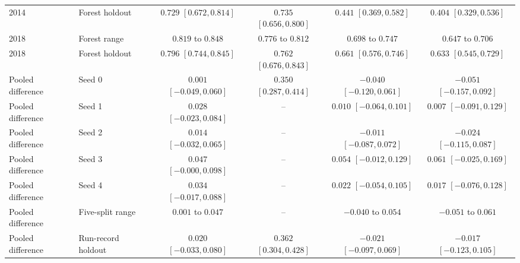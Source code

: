\begin{table}[t]
\begin{tabular}{@{}llcccc@{}}
2014 & Forest holdout & $0.729$ {\scriptsize $[0.672, 0.814]$} & $0.735$ {\scriptsize $[0.656, 0.800]$} & $0.441$ {\scriptsize $[0.369, 0.582]$} & $0.404$ {\scriptsize $[0.329, 0.536]$} \\
2018 & Forest range & $0.819$ to $0.848$ & $0.776$ to $0.812$ & $0.698$ to $0.747$ & $0.647$ to $0.706$ \\
2018 & Forest holdout & $0.796$ {\scriptsize $[0.744, 0.845]$} & $0.762$ {\scriptsize $[0.676, 0.843]$} & $0.661$ {\scriptsize $[0.576, 0.746]$} & $0.633$ {\scriptsize $[0.545, 0.729]$} \\
Pooled difference & Seed 0 & $0.001$ {\scriptsize $[-0.049, 0.060]$} & $0.350$ {\scriptsize $[0.287, 0.414]$} & $-0.040$ {\scriptsize $[-0.120, 0.061]$} & $-0.051$ {\scriptsize $[-0.157, 0.092]$} \\
Pooled difference & Seed 1 & $0.028$ {\scriptsize $[-0.023, 0.084]$} & -- & $0.010$ {\scriptsize $[-0.064, 0.101]$} & $0.007$ {\scriptsize $[-0.091, 0.129]$} \\
Pooled difference & Seed 2 & $0.014$ {\scriptsize $[-0.032, 0.065]$} & -- & $-0.011$ {\scriptsize $[-0.087, 0.072]$} & $-0.024$ {\scriptsize $[-0.115, 0.087]$} \\
Pooled difference & Seed 3 & $0.047$ {\scriptsize $[-0.000, 0.098]$} & -- & $0.054$ {\scriptsize $[-0.012, 0.129]$} & $0.061$ {\scriptsize $[-0.025, 0.169]$} \\
Pooled difference & Seed 4 & $0.034$ {\scriptsize $[-0.017, 0.088]$} & -- & $0.022$ {\scriptsize $[-0.054, 0.105]$} & $0.017$ {\scriptsize $[-0.076, 0.128]$} \\
Pooled difference & Five-split range & $0.001$ to $0.047$ & -- & $-0.040$ to $0.054$ & $-0.051$ to $0.061$ \\
Pooled difference & Run-record holdout & $0.020$ {\scriptsize $[-0.033, 0.080]$} & $0.362$ {\scriptsize $[0.304, 0.428]$} & $-0.021$ {\scriptsize $[-0.097, 0.069]$} & $-0.017$ {\scriptsize $[-0.123, 0.105]$} \\
\bottomrule
\end{tabular}

\end{table}
